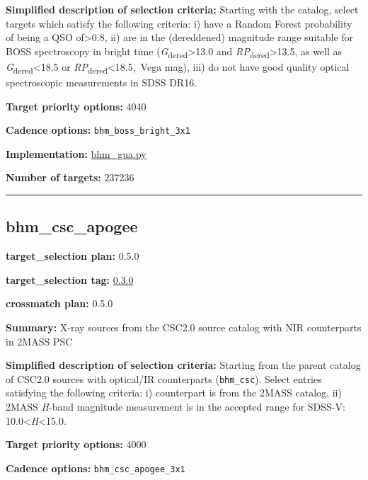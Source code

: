\noindent\textbf{Simplified description of selection criteria:} Starting with the
\citet{Shu2019} catalog, select targets which satisfy the following
criteria: i) have a Random Forest probability of being a QSO
of\textgreater0.8, ii) are in the (dereddened) magnitude range suitable
for BOSS spectroscopy in bright time
(\emph{G}\textsubscript{dered}\textgreater13.0 and
\emph{RP}\textsubscript{dered}\textgreater13.5, as well as
\emph{G}\textsubscript{dered}\textless18.5 or
\emph{RP}\textsubscript{dered}\textless18.5,~Vega mag), iii) do not have
good quality optical spectroscopic measurements in SDSS DR16.


\noindent\textbf{Target priority options:} 4040

\noindent\textbf{Cadence options:} \texttt{bhm\_boss\_bright\_3x1}

\noindent\textbf{Implementation:}
\href{https://github.com/sdss/target_selection/blob/0.1.0/python/target_selection/cartons/bhm_gua.py}{bhm\_gua.py}

\noindent\textbf{Number of targets:} 237236

\begin{center}\rule{0.5\linewidth}{0.5pt}\end{center}

\hypertarget{bhm_csc_apogee_plan0.5.0}{%
\subsection{bhm\_csc\_apogee}\label{bhm_csc_apogee_plan0.5.0}}

\noindent\textbf{target\_selection plan:} 0.5.0

\noindent\textbf{target\_selection tag:}
\href{https://github.com/sdss/target_selection/tree/0.3.0/}{0.3.0}

\noindent\textbf{crossmatch plan:} 0.5.0

\noindent\textbf{Summary:} X-ray sources from the CSC2.0 source catalog with NIR
counterparts in 2MASS PSC

\noindent\textbf{Simplified description of selection criteria:} Starting from the
parent catalog of CSC2.0 sources with optical/IR counterparts
(\texttt{bhm\_csc}). Select entries satisfying the following criteria:
i) counterpart is from the 2MASS catalog, ii) 2MASS \emph{H}-band
magnitude measurement is in the accepted range for SDSS-V:
10.0\textless{}\emph{H}\textless15.0.


\noindent\textbf{Target priority options:} 4000

\noindent\textbf{Cadence options:} \texttt{bhm\_csc\_apogee\_3x1}

